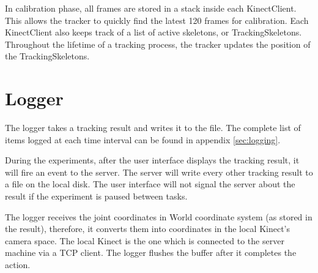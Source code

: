 In calibration phase, all frames are stored in a stack inside each KinectClient. This allows the tracker to quickly find the latest 120 frames for calibration. Each KinectClient also keeps track of a list of active skeletons, or TrackingSkeletons. Throughout the lifetime of a tracking process, the tracker updates the position of the TrackingSkeletons.

\section{Logger}
\label{sec:implementation_logger}

The logger takes a tracking result and writes it to the file. The complete list of items logged at each time interval can be found in appendix \ref{sec:logging}.

During the experiments, after the user interface displays the tracking result, it will fire an event to the server. The server will write every other tracking result to a file on the local disk. The user interface will not signal the server about the result if the experiment is paused between tasks.

The logger receives the joint coordinates in World coordinate system (as stored in the result), therefore, it converts them into coordinates in the local Kinect's camera space. The local Kinect is the one which is connected to the server machine via a TCP client. The logger flushes the buffer after it completes the action.


